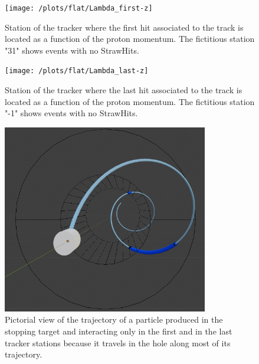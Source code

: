 \documentclass[12pt,a4paper,openright, oneside, titlepage]{book} %
\begin{document}
\begin{figure}[!htb]
\centering
\texttt{[image: /plots/flat/Lambda\_first-z]}
\caption[Station of first StrawHit]{Station of the tracker where the first hit associated to the track is located 
as a function of the proton momentum. The fictitious station "31" shows events with no StrawHits.}
\label{_Lambda_first-z}
\end{figure}

\begin{figure}[!htb]
\centering
\texttt{[image: /plots/flat/Lambda\_last-z]}
\caption[Station of last StrawHit]{Station of the tracker where the last hit associated to the track is located 
as a function of the proton momentum. The fictitious station "-1" shows events with no StrawHits.}
\label{_Lambda_last-z}
\end{figure}

\begin{figure}[!htb]
\centering
\includegraphics[width =0.8\textwidth, keepaspectratio]{Blender_Tracker_4}
\caption[Pictorial view of the trajectory of a particle traveling in the bore]
{Pictorial view of the trajectory of a particle produced in the stopping target and interacting only 
in the first and in the last tracker stations because it travels in the hole along most
of its trajectory.}
\label{_blender}
\end{figure}
\end{document}
